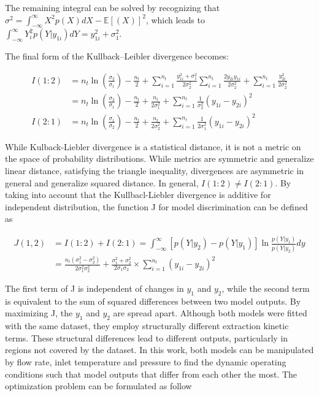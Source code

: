 \documentclass[]{scrartcl}
\begin{document}
The remaining integral can be solved by recognizing that $\sigma^2 = \int_{-\infty}^{\infty} X^2 p(X) dX - \mathbb{E}[(X)]^2$, which leads to $\int_{-\infty}^{\infty} Y_i^2 p(Y|y_{1i}) dY = y_{1i}^2 + \sigma_1^2$. 

The final form of the Kullback–Leibler divergence becomes:

\begin{align}
	I(1:2) &= n_t \ln \left(\frac{\sigma_2}{\sigma_1} \right) - \frac{n_t}{2} + \sum_{i=1}^{n_t} \frac{y_{1i}^2 + \sigma_1^2}{2\sigma_2^2} \sum_{i=1}^{n_t} \frac{2y_{2i}y_{1i}}{2\sigma_2^2} +\sum_{i=1}^{n_t}  \frac{y_{2i}^2}{2\sigma_2^2} \nonumber \\
	&= n_t \ln \left(\frac{\sigma_2}{\sigma_1} \right) - \frac{n_t}{2} + \frac{n_t}{2\sigma_1^2} + \sum_{i=1}^{n_t} \frac{1}{\sigma_2^2} \left( y_{1i} - y_{2i} \right)^2 \\
	I(2:1) &= n_t \ln \left(\frac{\sigma_1}{\sigma_2} \right) - \frac{n_t}{2} + \frac{n_t}{2\sigma_2^2} + \sum_{i=1}^{n_t} \frac{1}{2\sigma_1^2} \left( y_{1i} - y_{2i} \right)^2
\end{align} 

While Kulback-Liebler divergence is a statistical distance, it is not a metric on the space of probability distributions. While metrics are symmetric and generalize linear distance, satisfying the triangle inequality, divergences are asymmetric in general and generalize squared distance. In general, $I(1:2)\neq I(2:1)$. By taking into account that the Kullbacl-Liebler divergence is additive for independent distribution, the function J for model discrimination can be defined as 

\begin{align}
	J(1,2) &= I(1:2) + I(2:1) = \int_{-\infty}^{\infty} [p(Y|y_2) - p(Y|y_1)] \ln \frac{p(Y|y_1)}{p(Y|y_2)} dy \nonumber \\
	&= \frac{n_t(\sigma_1^2-\sigma_2^2)}{2\sigma_1^2\sigma_2^2} + \frac{\sigma_1^2+\sigma_2^2}{2\sigma_1\sigma_2}\times \sum_{i=1}^{n_t} \left( y_{1i}-y_{2i} \right)^2
\end{align}

The first term of J is independent of changes in $y_{1}$ and $y_{2}$, while the second term is equivalent to the sum of squared differences between two model outputs. By maximizing J, the $y_1$ and $y_2$ are spread apart. Although both models were fitted with the same dataset, they employ structurally different extraction kinetic terms. These structural differences lead to different outputs, particularly in regions not covered by the dataset. In this work, both models can be manipulated by flow rate, inlet temperature and pressure to find the dynamic operating conditions such that model outputs that differ from each other the most. The optimization problem can be formulated as follow
\end{document}
